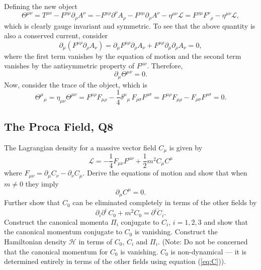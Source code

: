 \begin{solution}
    Defining the new object
    \begin{equation}\boxed{
        \Theta^{\mu\nu} = T^{\mu\nu} - F^{\rho\mu}\partial_\rho A^\nu = -F^{\mu\rho}\partial^\nu A_\rho - F^{\rho\mu}\partial_\rho A^\nu - \eta^{\mu\nu}\mathcal{L} = F^{\rho\mu}F^\nu{}_\rho - \eta^{\mu\nu}\mathcal{L},}
    \end{equation}
    which is clearly gauge invariant and symmetric. To see that the above quantity is also a conserved current, consider
    \begin{equation}
        \partial_\mu(F^{\mu\rho}\partial_\rho A_\nu) = \partial_\mu F^{\mu\rho}\partial_\rho A_\nu + F^{\mu\rho}\partial_\mu\partial_\rho A_\nu=0,
    \end{equation}
    where the first term vanishes by the equation of motion and the second term vanishes  by the antisymmetric property of $F^{\mu\nu}$. Therefore, 
    \begin{equation}
        \partial_\mu \Theta^{\mu\nu}=0.
    \end{equation}
    Now, consider the trace of the object, which is
    \begin{equation}
        \Theta^\mu{}_\mu = \eta_{\mu\nu}\Theta^{\mu\nu} = F^{\mu\rho}F_{\mu\rho} - \frac{1}{4}\delta^\mu{}_\mu\, F_{\rho\sigma}F^{\rho\sigma} = F^{\mu\rho}F_{\mu\rho} - F_{\rho\sigma}F^{\rho\sigma} = 0. 
    \end{equation}
\end{solution}

\subsection{The Proca Field, Q8}

The Lagrangian density for a massive vector field $C_\mu$ is given by
\begin{equation}
    \mathcal{L} = -\frac{1}{4}F_{\mu\nu}F^{\mu\nu} + \frac{1}{2}m^2 C_\mu C^\mu
\end{equation}
where $F_{\mu\nu} = \partial_\mu C_\nu - \partial_\nu C_\mu$. Derive the equations of motion and show that when $m \neq 0$ they imply
\begin{equation}
    \partial_\mu C^\mu = 0.
\end{equation}
Further show that $C_0$ can be eliminated completely in terms of the other fields by
\begin{equation}
    \partial_i\partial^i\, C_0 + m^2 C_0 = \partial^i\dot{C}_i.
    \label{eq:C}
\end{equation}
Construct the canonical momenta $\Pi_i$ conjugate to $C_i$, $i = 1,2,3$ and show that the canonical momentum conjugate to $C_0$ is vanishing. Construct the Hamiltonian density $\mathcal{H}$ in terms of $C_0$, $C_i$ and $\Pi_i$. (Note: Do not be concerned that the canonical momentum for $C_0$ is vanishing. $C_0$ is non-dynamical --- it is determined entirely in terms of the other fields using equation (\ref{eq:C})).

